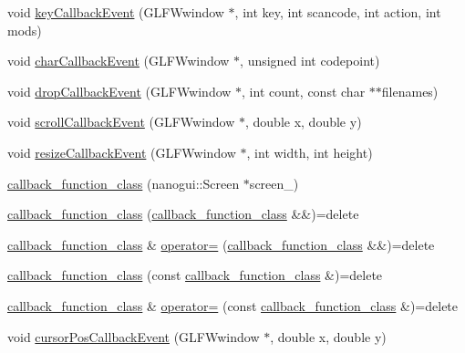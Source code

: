 \begin{DoxyCompactItemize}
\item 
void \mbox{\hyperlink{classcallback__function__class_a162788695c9e6440dd8fac6dc26339ba}{key\+Callback\+Event}} (G\+L\+F\+Wwindow $\ast$, int key, int scancode, int action, int mods)
\item 
void \mbox{\hyperlink{classcallback__function__class_ab4c81c8f3d119dc3cc2f12fb19894ec3}{char\+Callback\+Event}} (G\+L\+F\+Wwindow $\ast$, unsigned int codepoint)
\item 
void \mbox{\hyperlink{classcallback__function__class_a4e4219cee44a256cc9d44f0af6f3378b}{drop\+Callback\+Event}} (G\+L\+F\+Wwindow $\ast$, int count, const char $\ast$$\ast$filenames)
\item 
void \mbox{\hyperlink{classcallback__function__class_a69db9bcdb11b09b15c2db0231fb6a5cf}{scroll\+Callback\+Event}} (G\+L\+F\+Wwindow $\ast$, double x, double y)
\item 
void \mbox{\hyperlink{classcallback__function__class_a9502656bb0f93b5f085f8767189a537f}{resize\+Callback\+Event}} (G\+L\+F\+Wwindow $\ast$, int width, int height)
\item 
\mbox{\hyperlink{classcallback__function__class_a57fb8498117533dce172a53182182787}{callback\+\_\+function\+\_\+class}} (nanogui\+::\+Screen $\ast$screen\+\_\+)
\item 
\mbox{\hyperlink{classcallback__function__class_a1fae5711b34c371261d280afb9085756}{callback\+\_\+function\+\_\+class}} (\mbox{\hyperlink{classcallback__function__class}{callback\+\_\+function\+\_\+class}} \&\&)=delete
\item 
\mbox{\hyperlink{classcallback__function__class}{callback\+\_\+function\+\_\+class}} \& \mbox{\hyperlink{classcallback__function__class_add0667bafa4b40d9726fe353f02a969a}{operator=}} (\mbox{\hyperlink{classcallback__function__class}{callback\+\_\+function\+\_\+class}} \&\&)=delete
\item 
\mbox{\hyperlink{classcallback__function__class_a966edfa3807e811f7e9b9c1ee2185b3e}{callback\+\_\+function\+\_\+class}} (const \mbox{\hyperlink{classcallback__function__class}{callback\+\_\+function\+\_\+class}} \&)=delete
\item 
\mbox{\hyperlink{classcallback__function__class}{callback\+\_\+function\+\_\+class}} \& \mbox{\hyperlink{classcallback__function__class_abe53fd6cc7a9a772b725144dc3deaa4b}{operator=}} (const \mbox{\hyperlink{classcallback__function__class}{callback\+\_\+function\+\_\+class}} \&)=delete
\item 
void \mbox{\hyperlink{classcallback__function__class_a29cef5bc1458b2189e026310e0774e66}{cursor\+Pos\+Callback\+Event}} (G\+L\+F\+Wwindow $\ast$, double x, double y)
$$
\end{DoxyCompactItemize}
